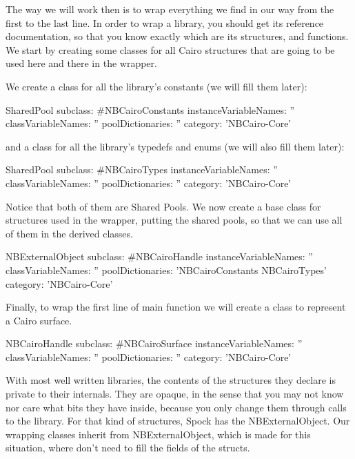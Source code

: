 \documentclass[a4paper,10pt,twoside]{book}
\begin{document}
The way we will work then is to wrap everything we find in
our way from the first to the last line. In order to wrap a
library, you should get its reference documentation, so that
you know exactly which are its structures, and functions.
We start by creating some classes for all Cairo structures
that are going to be used here and there in the wrapper.

We create a class for all the library's constants (we will
fill them later):

\begin{classdef}{}
SharedPool subclass: #NBCairoConstants
	instanceVariableNames: ''
	classVariableNames: ''
	poolDictionaries: ''
	category: 'NBCairo-Core'
\end{classdef}

and a class for all the library's typedefs and enums (we will
also fill them later):

\begin{classdef}{}
SharedPool subclass: #NBCairoTypes
	instanceVariableNames: ''
	classVariableNames: ''
	poolDictionaries: ''
	category: 'NBCairo-Core'
\end{classdef}

Notice that both of them are Shared Pools. We now create a base
class for structures used in the wrapper, putting the shared pools,
so that we can use all of them in the derived classes. 

\begin{classdef}{}
NBExternalObject subclass: #NBCairoHandle
	instanceVariableNames: ''
	classVariableNames: ''
	poolDictionaries: 'NBCairoConstants NBCairoTypes'
	category: 'NBCairo-Core'
\end{classdef}

Finally, to wrap the first line of main function we will create a
class to represent a Cairo surface.

\begin{classdef}{}
NBCairoHandle subclass: #NBCairoSurface
	instanceVariableNames: ''
	classVariableNames: ''
	poolDictionaries: ''
	category: 'NBCairo-Core'
\end{classdef}

With most well written libraries, the contents of the structures
they declare is private to their internals. They are opaque, in the
sense that you may not know nor care what bits they have inside,
because you only change them through calls to the library.
For that kind of structures, Spock has the NBExternalObject.
Our wrapping classes inherit from NBExternalObject, which is
made for this situation, where don't need to fill the fields
of the structs.
\end{document}

